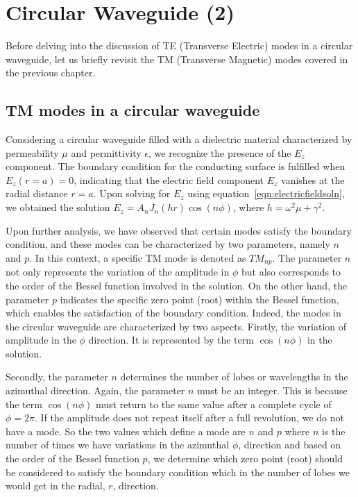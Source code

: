\chapter{Circular Waveguide (2)}\label{lec:lec45}
Before delving into the discussion of TE (Transverse Electric) modes in a circular waveguide, let us briefly revisit the TM (Transverse Magnetic) modes covered in the previous chapter. 

\section{TM modes in a circular waveguide}
Considering a circular waveguide filled with a dielectric material characterized by permeability $\mu$ and permittivity $\epsilon$, we recognize the presence of the $E_z$ component. The boundary condition for the conducting surface is fulfilled when $E_z(r=a) = 0$, indicating that the electric field component $E_z$ vanishes at the radial distance $r=a$. Upon solving for $E_z$ using equation~\eqref{eqn:electricfieldsoln}, we obtained the solution $E_z = A_n J_n(hr)\cos(n\phi)$, where $h = \omega^2\mu + \gamma^2$.

Upon further analysis, we have observed that certain modes satisfy the boundary condition, and these modes can be characterized by two parameters, namely $n$ and $p$. In this context, a specific TM mode is denoted as $TM_{np}$. The parameter $n$ not only represents the variation of the amplitude in $\phi$ but also corresponds to the order of the Bessel function involved in the solution. On the other hand, the parameter $p$ indicates the specific zero point (root) within the Bessel function, which enables the satisfaction of the boundary condition. Indeed, the modes in the circular waveguide are characterized by two aspects. Firstly, the variation of amplitude in the $\phi$ direction. It is represented by the term $\cos(n\phi)$ in the solution.

Secondly, the parameter $n$ determines the number of lobes or wavelengths in the azimuthal direction. Again, the parameter $n$ must be an integer. This is because the term $\cos(n\phi)$ must return to the same value after a complete cycle of $\phi=2\pi$. If the amplitude does not repeat itself after a full revolution, we do not have a mode. So the two values which define a mode are $n$ and $p$ where $n$ is the number of times we have variations in the azimuthal $\phi$, direction and based on the order of the Bessel function $p$, we determine which zero point (root) should be considered to satisfy the boundary condition which in the number of lobes we would get in the radial, $r$, direction.

